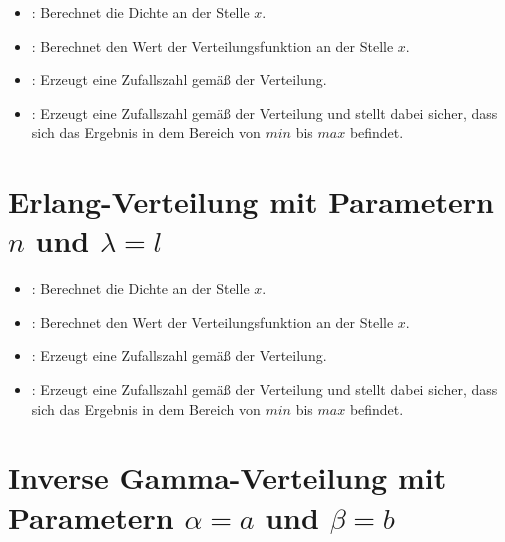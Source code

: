 \begin{itemize}

\item
{}:
Berechnet die Dichte an der Stelle $x$.

\item
{}:
Berechnet den Wert der Verteilungsfunktion an der Stelle $x$.

\item
{}:
Erzeugt eine Zufallszahl gemäß der Verteilung.

\item
{}:
Erzeugt eine Zufallszahl gemäß der Verteilung und stellt dabei sicher, dass sich das Ergebnis in dem Bereich von $min$ bis $max$ befindet.

\end{itemize}



\section{Erlang-Verteilung mit Parametern \texorpdfstring{$n$}{n} und \texorpdfstring{$\lambda=l$}{l}}

\begin{itemize}

\item
{}:
Berechnet die Dichte an der Stelle $x$.

\item
{}:
Berechnet den Wert der Verteilungsfunktion an der Stelle $x$.

\item
{}:
Erzeugt eine Zufallszahl gemäß der Verteilung.

\item
{}:
Erzeugt eine Zufallszahl gemäß der Verteilung und stellt dabei sicher, dass sich das Ergebnis in dem Bereich von $min$ bis $max$ befindet.

\end{itemize}



\section{Inverse Gamma-Verteilung mit Parametern \texorpdfstring{$\alpha=a$}{a} und \texorpdfstring{$\beta=b$}{b}}

